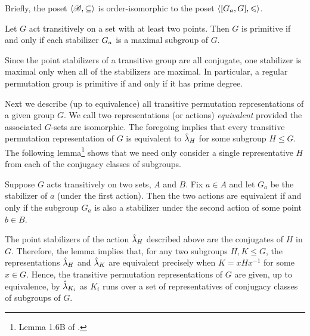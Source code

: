 Briefly, the poset $\langle\mathscr{B}, \subseteq\rangle$ is order-isomorphic to the 
poset $\langle[G_{a},G], \leqslant\rangle$. 

\begin{corollary}
  Let $G$ act transitively on a set with at least two
  points. 
  Then $G$ is primitive if and only if each stabilizer $G_{a}$ is a
  maximal subgroup of $G$.
\end{corollary}

Since the point stabilizers of a transitive group are all conjugate, 
one stabilizer is maximal only when all of the stabilizers are maximal. 
In particular, a regular permutation group is primitive if and only if it has
prime degree. 

Next we describe (up to equivalence) all transitive permutation
representations of a given group $G$.  
We call two representations (or actions) 
%
\emph{equivalent}
provided the associated $G$-sets are isomorphic. 
The foregoing implies that every transitive permutation representation of $G$ is
equivalent to $\hat{\lambda}_H$ for some subgroup $H \leq G$.  The following
lemma\footnote{Lemma 1.6B of \cite{Dixon:1996}.} 
shows that we need only consider a single representative $H$ from each of the
conjugacy classes of subgroups.  

\begin{lemma}
  Suppose $G$ acts transitively on two sets,
  $A$ and $B$.  Fix $a\in A$ and let $G_a$ be the stabilizer of $a$ (under the first
  action).  Then the two actions are equivalent
  if and only if the subgroup $G_a$ is also a stabilizer under the second action
  of some point $b\in B$. 
\end{lemma}

The point stabilizers of the action $\hat{\lambda}_H$ described above are the
conjugates of $H$ in $G$.  Therefore, the lemma implies that, for any two
subgroups $H, K \leq G$, the representations $\hat{\lambda}_H$ and $\hat{\lambda}_K$ are
equivalent precisely when $K = x Hx^{-1}$ for some $x\in G$. 
Hence, the transitive permutation representations of $G$ are given, up to
equivalence, by $\hat{\lambda}_{K_i}$ as $K_i$ runs over a set of representatives of
conjugacy classes of subgroups of $G$.   



